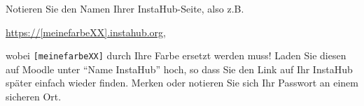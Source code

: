 \begin{myexercise}
  Notieren Sie den Namen Ihrer InstaHub-Seite, also z.B.
  \begin{center}
    \url{https://[meinefarbeXX].instahub.org},
  \end{center}
  wobei \texttt{[meinefarbeXX]} durch Ihre Farbe ersetzt werden muss!
  Laden Sie diesen auf Moodle unter \enquote{Name InstaHub} hoch, so dass Sie den Link auf Ihr InstaHub später einfach wieder finden. Merken oder notieren Sie sich Ihr Passwort an einem sicheren Ort.
\end{myexercise}










